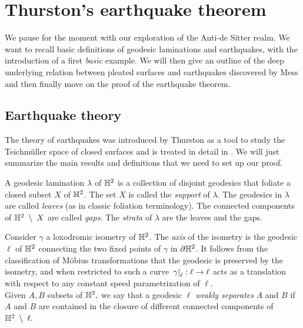 \chapter{Thurston's earthquake theorem}

We pause for the moment with our exploration of the Anti-de Sitter realm. We want to recall basic definitions of geodesic laminations and earthquakes, with the introduction of a first \textit{basic} example. We will then give an outline of the deep underlying relation between pleated surfaces and earthquakes discovered by Mess and then finally move on the proof of the earthquake theorem. 


\section{Earthquake theory}
The theory of earthquakes was introduced by Thurston as a tool to study the Teichmüller space of closed surfaces and is treated in detail in \cite{kapovich2001hyperbolic}. We will just summarize the main results and definitions that we need to set up our proof. 

\begin{definition}
    A geodesic lamination $\lambda$ of $\mathbb{H}^2$ is a collection of disjoint geodesics that foliate a closed subset $X$ of $\mathbb{H}^2$. The set $X$ is called the \textit{support} of $\lambda.$ The geodesics in $\lambda$ are called \textit{leaves} (as in classic foliation terminology). The connected components of $\mathbb{H}^2\;\setminus\;X$ are called \textit{gaps}. The \textit{strata} of $\lambda$ are the leaves and the gaps.
\end{definition}

\noindent Consider $\gamma$ a loxodromic isometry of $\mathbb{H}^2$. The \textit{axis} of the isometry is the geodesic $\ell$ of $\mathbb{H}^2$ connecting the two fixed points of $\gamma$ in $\partial\mathbb{H}^2$. It follows from the classification of Möbius transformations that the geodesic is preserved by the isometry, and when restricted to such a curve $\left.\gamma\right|_{\ell}:\ell\to\ell$ acts as a translation with respect to any constant speed parametrization of $\ell$.\\
Given $A,B$ subsets of $\mathbb{H}^2,$ we say that a geodesic $\ell$ \textit{weakly separates} $A$ and $B$ if $A$ and $B$ are contained in the closure of different connected components of $\mathbb{H}^2\;\setminus\;\ell.$ 

